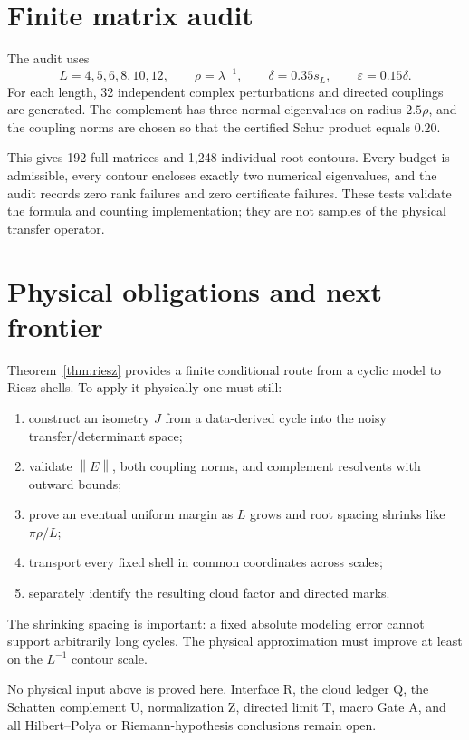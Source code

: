 \documentclass[12pt]{article}
\theoremstyle{remark}
\newcommand{\norm}[1]{\left\lVert#1\right\rVert}
\begin{document}
\section{Finite matrix audit}

The audit uses
\[
 L=4,5,6,8,10,12,
 \qquad \rho=\lambda^{-1},
 \qquad \delta=0.35s_L,
 \qquad \varepsilon=0.15\delta.
\]
For each length, 32 independent complex perturbations and directed couplings
are generated.  The complement has three normal eigenvalues on radius
$2.5\rho$, and the coupling norms are chosen so that the certified Schur
product equals $0.20$.

This gives 192 full matrices and 1,248 individual root contours.  Every
budget is admissible, every contour encloses exactly two numerical
eigenvalues, and the audit records zero rank failures and zero certificate
failures.  These tests validate the formula and counting implementation; they
are not samples of the physical transfer operator.

\section{Physical obligations and next frontier}

Theorem~\ref{thm:riesz} provides a finite conditional route from a cyclic
model to Riesz shells.  To apply it physically one must still:
\begin{enumerate}[leftmargin=2em]
\item construct an isometry $J$ from a data-derived cycle into the noisy
transfer/determinant space;
\item validate $\norm E$, both coupling norms, and complement resolvents with
outward bounds;
\item prove an eventual uniform margin as $L$ grows and root spacing shrinks
like $\pi\rho/L$;
\item transport every fixed shell in common coordinates across scales;
\item separately identify the resulting cloud factor and directed marks.
\end{enumerate}
The shrinking spacing is important: a fixed absolute modeling error cannot
support arbitrarily long cycles.  The physical approximation must improve at
least on the $L^{-1}$ contour scale.

No physical input above is proved here.  Interface R, the cloud ledger Q, the
Schatten complement U, normalization Z, directed limit T, macro Gate A, and
all Hilbert--Polya or Riemann-hypothesis conclusions remain open.



\end{document}
